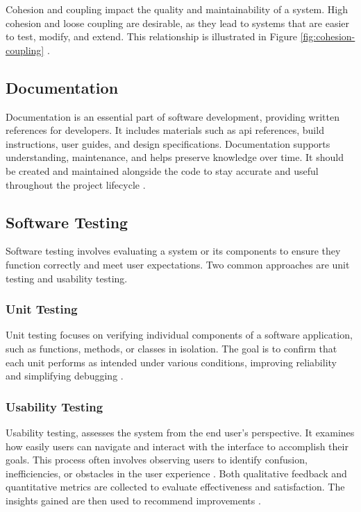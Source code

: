 Cohesion and coupling impact the quality and maintainability of a system.
High cohesion and loose coupling are desirable, as they lead to systems that are easier to test, modify, and extend. This relationship is illustrated in Figure \ref{fig:cohesion-coupling} 
\cite{geeksforgeeks:c&c}.

\subsection{Documentation}
\label{subsec:documentation}

Documentation is an essential part of software development, providing written references for developers. It includes materials such as \gls{api} references, build instructions, user guides, and design specifications. Documentation supports understanding, maintenance, and helps preserve knowledge over time. It should be created and maintained alongside the code to stay accurate and useful throughout the project lifecycle \cite{geeksforgeeks:doc}.

\subsection{Software Testing}
\label{subsec:testing}

Software testing involves evaluating a system or its components to ensure they function correctly and meet user expectations. Two common approaches are unit testing and usability testing. \\

\subsubsection*{Unit Testing}

Unit testing focuses on verifying individual components of a software application, such as functions, methods, or classes in isolation. The goal is to confirm that each unit performs as intended under various conditions, improving reliability and simplifying debugging \cite{geeksforgeeks:unit-test}. \\

\subsubsection*{Usability Testing}

Usability testing, assesses the system from the end user’s perspective. It examines how easily users can navigate and interact with the interface to accomplish their goals. This process often involves observing users to identify confusion, inefficiencies, or obstacles in the user experience \cite{geeksforgeeks:user-test}. Both qualitative feedback and quantitative metrics are collected to evaluate effectiveness and satisfaction. The insights gained are then used to recommend improvements \cite{geeksforgeeks:user-test}.

